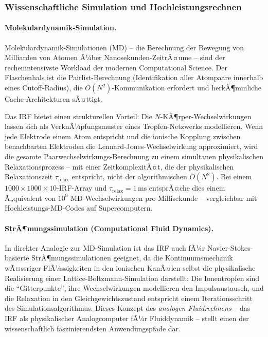 ﻿\documentclass[a4paper,12pt]{scrreprt}
\theoremstyle{definition}
\begin{document}
\subsubsection{Wissenschaftliche Simulation und Hochleistungsrechnen}
\label{subsubsec:hpc}

\paragraph{Molekulardynamik-Simulation.}
Molekulardynamik-Simulationen (MD) -- die Berechnung der Bewegung von
Milliarden von Atomen Ã¼ber Nanosekunden-ZeitrÃ¤ume -- sind der
rechenintensivste Workload der modernen Computational Science.
Der Flaschenhals ist die Pairlist-Berechnung (Identifikation aller
Atompaare innerhalb eines Cutoff-Radius), die $O(N^2)$-Kommunikation
erfordert und herkÃ¶mmliche Cache-Architekturen sÃ¤ttigt.

Das IRF bietet einen strukturellen Vorteil: Die $N$-KÃ¶rper-Wechselwirkungen
lassen sich als VerknÃ¼pfungsmuster eines Tropfen-Netzwerks modellieren.
Wenn jede Elektrode einem Atom entspricht und die ionische Kopplung
zwischen benachbarten Elektroden die Lennard-Jones-Wechselwirkung
approximiert, wird die gesamte Paarwechselwirkungs-Berechnung zu einem
simultanen physikalischen Relaxationsprozess -- mit einer ZeitkomplexitÃ¤t,
die der physikalischen Relaxationszeit $\tau_\text{relax}$ entspricht,
nicht der algorithmischen $O(N^2)$. Bei einem $1000 \times 1000 \times 10$-IRF-Array
und $\tau_\text{relax} = 1$\,ms entsprÃ¤che dies einem Ã„quivalent von
$10^9$ MD-Wechselwirkungen pro Millisekunde -- vergleichbar mit
Hochleistungs-MD-Codes auf Supercomputern.

\paragraph{StrÃ¶mungssimulation (Computational Fluid Dynamics).}
In direkter Analogie zur MD-Simulation ist das IRF auch fÃ¼r
Navier-Stokes-basierte StrÃ¶mungssimulationen geeignet, da die
Kontinuumsmechanik wÃ¤ssriger FlÃ¼ssigkeiten in den ionischen KanÃ¤len
selbst die physikalische Realisierung einer Lattice-Boltzmann-Simulation
darstellt: Die Ionentropfen sind die ``Gitterpunkte'', ihre
Wechselwirkungen modellieren den Impulsaustausch, und die Relaxation
in den Gleichgewichtszustand entspricht einem Iterationsschritt des
Simulationsalgorithmus. Dieses Konzept des \emph{analogen Fluidrechnens}
-- das IRF als physikalischer Analogcomputer fÃ¼r Fluiddynamik -- stellt
einen der wissenschaftlich faszinierendsten Anwendungspfade dar.
\end{document}
